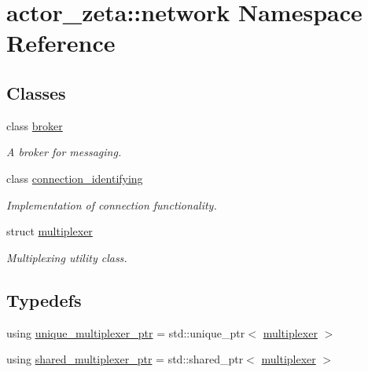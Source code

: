 \hypertarget{namespaceactor__zeta_1_1network}{}\section{actor\+\_\+zeta\+:\+:network Namespace Reference}
\label{namespaceactor__zeta_1_1network}
\subsection*{Classes}
\begin{DoxyCompactItemize}
\item 
class \hyperlink{classactor__zeta_1_1network_1_1broker}{broker}
\begin{DoxyCompactList}\small\item\em A broker for messaging. \end{DoxyCompactList}\item 
class \hyperlink{classactor__zeta_1_1network_1_1connection__identifying}{connection\+\_\+identifying}
\begin{DoxyCompactList}\small\item\em Implementation of connection functionality. \end{DoxyCompactList}\item 
struct \hyperlink{structactor__zeta_1_1network_1_1multiplexer}{multiplexer}
\begin{DoxyCompactList}\small\item\em Multiplexing utility class. \end{DoxyCompactList}\end{DoxyCompactItemize}
\subsection*{Typedefs}
\begin{DoxyCompactItemize}
\item 
using \hyperlink{namespaceactor__zeta_1_1network_aca954f31343c8d2d513bebe30f6f87b4}{unique\+\_\+multiplexer\+\_\+ptr} = std\+::unique\+\_\+ptr$<$ \hyperlink{structactor__zeta_1_1network_1_1multiplexer}{multiplexer} $>$
\item 
using \hyperlink{namespaceactor__zeta_1_1network_a504802c43f97832081066e4c7aeb5f24}{shared\+\_\+multiplexer\+\_\+ptr} = std\+::shared\+\_\+ptr$<$ \hyperlink{structactor__zeta_1_1network_1_1multiplexer}{multiplexer} $>$
\end{DoxyCompactItemize}
